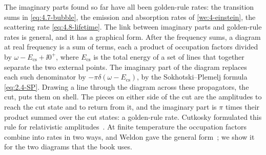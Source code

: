 The imaginary parts found so far have all been golden-rule rates: the transition sums in \cref{eq:4.7-bubble}, the emission and absorption rates of \cref{we:4-einstein}, the scattering rate \cref{eq:4.8-lifetime}. The link between imaginary parts and golden-rule rates is general, and it has a graphical form. After the frequency sums, a diagram at real frequency is a sum of terms, each a product of occupation factors divided by $\omega - E_{\mathrm{cs}} + \ii0^+$, where $E_{\mathrm{cs}}$ is the total energy of a set of lines that together separate the two external points. The imaginary part of the diagram replaces each such denominator by $-\pi\delta(\omega - E_{\mathrm{cs}})$, by the Sokhotski--Plemelj formula \cref{eq:2.4-SP}. Drawing a line through the diagram across these propagators, the cut, puts them on shell. The pieces on either side of the cut are the amplitudes to reach the cut state and to return from it, and the imaginary part is $\pi$ times their product summed over the cut states: a golden-rule rate. Cutkosky formulated this rule for relativistic amplitudes~\cite{cutkosky1960singularities}. At finite temperature the occupation factors combine into rates in two ways, and Weldon gave the general form~\cite{weldon1983simple}; we show it for the two diagrams that the book uses.

